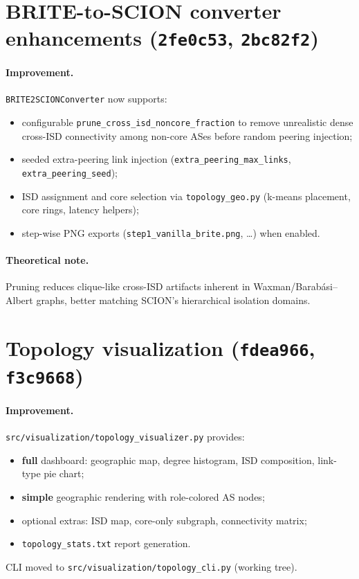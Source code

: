 \documentclass[11pt,a4paper,twoside,openright]{report}
\begin{document}
\section{BRITE-to-SCION converter enhancements (\texttt{2fe0c53}, \texttt{2bc82f2})}

\paragraph{Improvement.}
\texttt{BRITE2SCIONConverter} now supports:
\begin{itemize}
  \item configurable \texttt{prune\_cross\_isd\_noncore\_fraction} to remove unrealistic
    dense cross-ISD connectivity among non-core ASes before random peering injection;
  \item seeded extra-peering link injection (\texttt{extra\_peering\_max\_links},
    \texttt{extra\_peering\_seed});
  \item ISD assignment and core selection via \texttt{topology\_geo.py} (k-means placement,
    core rings, latency helpers);
  \item step-wise PNG exports (\texttt{step1\_vanilla\_brite.png}, \ldots) when enabled.
\end{itemize}

\paragraph{Theoretical note.}
Pruning reduces clique-like cross-ISD artifacts inherent in Waxman/Barabási--Albert
graphs, better matching SCION's hierarchical isolation domains.

\section{Topology visualization (\texttt{fdea966}, \texttt{f3c9668})}

\paragraph{Improvement.}
\texttt{src/visualization/topology\_visualizer.py} provides:
\begin{itemize}
  \item \textbf{full} dashboard: geographic map, degree histogram, ISD composition,
    link-type pie chart;
  \item \textbf{simple} geographic rendering with role-colored AS nodes;
  \item optional extras: ISD map, core-only subgraph, connectivity matrix;
  \item \texttt{topology\_stats.txt} report generation.
\end{itemize}
CLI moved to \texttt{src/visualization/topology\_cli.py} (working tree).
\end{document}
